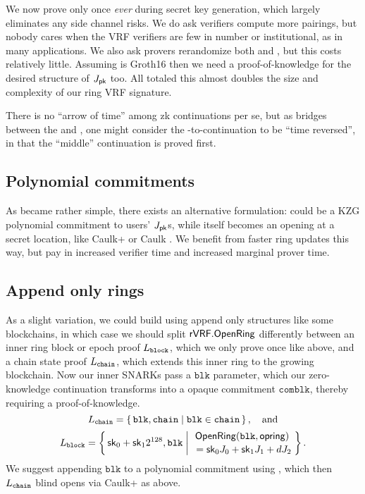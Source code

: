 We now prove \pisk only once {\it ever} during secret key generation,
which largely eliminates any side channel risks.
We do ask verifiers compute more pairings, but nobody cares when
the VRF verifiers are few in number or institutional,
as in many applications.
We also ask provers rerandomize both \pisk and \pipk, but this costs relatively little.
Assuming \pipk is Groth16 then we need a proof-of-knowledge for the desired structure of $J_\mathsf{pk}$ too.
All totaled this almost doubles the size and complexity of our ring VRF signature.

There is no ``arrow of time'' among zk continuations per se, but
as \pisk bridges between the \PedVRF and \pipk,
one might consider the \pisk-to-\pipk continuation to be ``time reversed'',
 in that the ``middle'' continuation is proved first.


\subsection{Polynomial commitments}
\label{subsec:rvrf_caulk}

As \pipk became rather simple, %
there exists an alternative formulation:  
\comring could be a KZG polynomial commitment \cite{KZG} to users' $J_\mathsf{pk}$s,
while \pipk itself becomes an opening at a secret location, like
Caulk+ \cite{caulk+} or Caulk \cite{caulk}.
We benefit from faster ring updates this way, but pay in
 increased verifier time and increased marginal prover time.


\subsection{Append only rings}

\newcommand\pichain{\ensuremath{\pi_{\mathtt{chain}}}\xspace}

As a slight variation,
we could build \ring using append only structures like some blockchains,
in which case we should split ${\mathsf{rVRF}}.{\mathsf{OpenRing}}$ differently between
an inner ring block or epoch proof $L_{\mathtt{block}}$,
 which we only prove once like \pisk above, and
a chain state proof $L_{\mathtt{chain}}$,
 which extends this inner ring to the growing blockchain.
Now our inner SNARKs pass a $\mathtt{blk}$ parameter, which 
our zero-knowledge continuation transforms into a opaque commitment
$\mathtt{comblk}$, thereby requiring a proof-of-knowledge.
%
$$ \baseL_{\mathtt{chain}} = \Setst{ \mathtt{blk}, \mathtt{chain} }{
	\mathtt{blk} \in \mathtt{chain}
} \mathcomma \quad\textrm{and} $$ 
%
$$ \baseL_{\mathtt{block}} = \Setst{ \sk_0 + \sk_1 2^{128}, \mathtt{blk} }{
	\eprint{\exists d,\openring \textrm{\ s.t.\ }}{}
	\genfrac{}{}{0pt}{}{ \OpenRing(\mathtt{blk},\openring) }{ \,\, = \sk_0 \genJ_0 + \sk_1 \genJ_1 + d \genJ_2 }
} \mathperiod $$  
%
We suggest appending $\mathtt{blk}$ to a polynomial commitment using
\cite{aSVC}, which then $L_{\mathtt{chain}}$ blind opens
via Caulk+ \cite{caulk+} as above.


